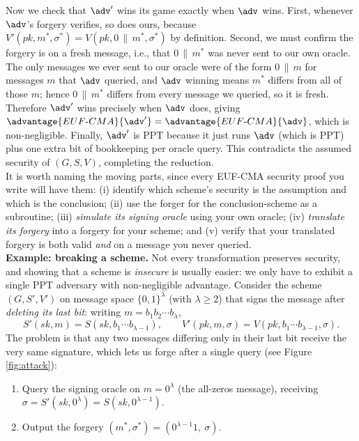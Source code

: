 \documentclass[12pt]{article}
\theoremstyle{definition}
\theoremstyle{remark}
\theoremstyle{definition}
\begin{document}
Now we check that $\adv'$ wins its game exactly when $\adv$ wins. First, whenever $\adv$'s forgery verifies, so does ours, because $V'(pk, m^*, \sigma^*) = V(pk, 0\,\|\,m^*, \sigma^*)$ by definition. Second, we must confirm the forgery is on a fresh message, i.e., that $0\,\|\,m^*$ was never sent to our own oracle. The only messages we ever sent to our oracle were of the form $0\,\|\,m$ for messages $m$ that $\adv$ queried, and $\adv$ winning means $m^*$ differs from all of those $m$; hence $0\,\|\,m^*$ differs from every message we queried, so it is fresh. Therefore $\adv'$ wins precisely when $\adv$ does, giving $\advantage{EUF\text{-}CMA}{\adv'} = \advantage{EUF\text{-}CMA}{\adv}$, which is non-negligible. Finally, $\adv'$ is PPT because it just runs $\adv$ (which is PPT) plus one extra bit of bookkeeping per oracle query. This contradicts the assumed security of $(G,S,V)$, completing the reduction.\\

It is worth naming the moving parts, since every EUF-CMA security proof you write will have them: (i) identify which scheme's security is the assumption and which is the conclusion; (ii) use the forger for the conclusion-scheme as a subroutine; (iii) \emph{simulate its signing oracle} using your own oracle; (iv) \emph{translate its forgery} into a forgery for your scheme; and (v) verify that your translated forgery is both valid \emph{and} on a message you never queried.\\

\textbf{Example: breaking a scheme.} Not every transformation preserves security, and showing that a scheme is \emph{insecure} is usually easier: we only have to exhibit a single PPT adversary with non-negligible advantage. Consider the scheme $(G, S', V')$ on message space $\{0,1\}^\lambda$ (with $\lambda \ge 2$) that signs the message after \emph{deleting its last bit}: writing $m = b_1 b_2\cdots b_\lambda$, $$S'(sk, m) = S(sk, b_1\cdots b_{\lambda-1}), \qquad V'(pk, m, \sigma) = V(pk, b_1\cdots b_{\lambda-1}, \sigma).$$ The problem is that any two messages differing only in their last bit receive the very same signature, which lets us forge after a single query (see Figure \ref{fig:attack}):
\begin{enumerate}[(1)]
\item Query the signing oracle on $m = 0^\lambda$ (the all-zeros message), receiving $\sigma = S'(sk, 0^\lambda) = S(sk, 0^{\lambda-1})$.
\item Output the forgery $(m^*, \sigma^*) = (0^{\lambda-1}1,\ \sigma)$.
\end{enumerate}
\end{document}
